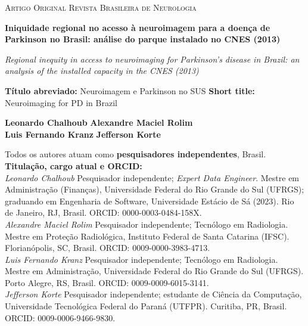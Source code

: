 \documentclass[12pt,a4paper,oneside]{article}
\begin{document}
\thispagestyle{fancy}
\begin{singlespace}

\begin{center}
{\small\textsc{Artigo Original \quad\textbar\quad Revista Brasileira de Neurologia}}

\vspace{12pt}
{\large\bfseries Iniquidade regional no acesso à neuroimagem para a
doença de Parkinson no Brasil: análise do parque instalado no CNES
(2013)\par}

\vspace{8pt}
{\itshape Regional inequity in access to neuroimaging for Parkinson's
disease in Brazil: an analysis of the installed capacity in the CNES
(2013)\par}

\vspace{8pt}
{\footnotesize\textbf{Título abreviado:} Neuroimagem e Parkinson no
SUS \quad\textbar\quad \textbf{Short title:} Neuroimaging for PD in
Brazil}

\vspace{14pt}
\textbf{Leonardo Chalhoub} \quad\textbullet\quad \textbf{Alexandre Maciel Rolim}\\[4pt]
\textbf{Luis Fernando Kranz} \quad\textbullet\quad \textbf{Jefferson Korte}
\end{center}

\vspace{0.4cm}
\small
\noindent Todos os autores atuam como \textbf{pesquisadores
independentes}, Brasil.\\[4pt]
\noindent\textbf{Titulação, cargo atual e ORCID:}\\[2pt]
\noindent\textit{Leonardo Chalhoub} \textemdash{} Pesquisador
independente; \textit{Expert Data Engineer}. Mestre em Administração
(Finanças), Universidade Federal do Rio Grande do Sul (UFRGS);
graduando em Engenharia de Software, Universidade Estácio de Sá
(2023). Rio de Janeiro, RJ, Brasil.
ORCID: 0000-0003-0484-158X.\\[2pt]
\noindent\textit{Alexandre Maciel Rolim} \textemdash{} Pesquisador
independente; Tecnólogo em Radiologia. Mestre em Proteção Radiológica,
Instituto Federal de Santa Catarina (IFSC). Florianópolis, SC, Brasil.
ORCID: 0009-0000-3983-4713.\\[2pt]
\noindent\textit{Luis Fernando Kranz} \textemdash{} Pesquisador
independente; Tecnólogo em Radiologia. Mestre em Administração,
Universidade Federal do Rio Grande do Sul (UFRGS). Porto Alegre, RS,
Brasil. ORCID: 0009-0009-6015-3141.\\[2pt]
\noindent\textit{Jefferson Korte} \textemdash{} Pesquisador
independente; estudante de Ciência da Computação, Universidade
Tecnológica Federal do Paraná (UTFPR). Curitiba, PR, Brasil.
ORCID: 0009-0006-9466-9830.


\end{singlespace}
\end{document}
